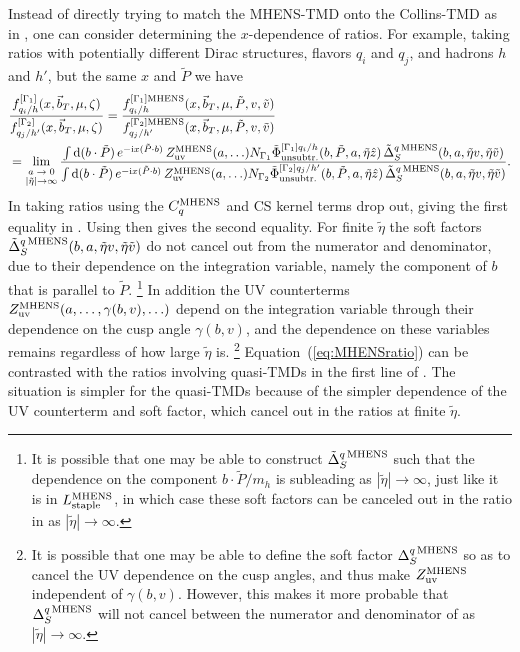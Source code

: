 \documentclass[11pt,a4paper]{article}
\newcommand{\df}{\mathrm{d}}
\newcommand{\img}{\mathrm{i}}
\newcommand{\nn}{\nonumber}
\newcommand{\bt}{\vec b_T}
\begin{document}
Instead of directly trying to match the MHENS-TMD onto the Collins-TMD as in , one can consider determining the $x$-dependence of ratios. For example, taking ratios with potentially different Dirac structures, flavors $q_i$ and $q_j$, and hadrons $h$ and $h'$, but the same $x$ and $\tilde P$ we have
\begin{align}\label{eq:MHENSratio}
 & \frac{ f_{q_i/h}^{[\Gamma_1]}(x,\bt, \mu, \zeta) }
   { f_{q_j/h'}^{[\Gamma_2]}(x,\bt, \mu, \zeta)}
 =  \frac{ f_{q_i/h}^{[\Gamma_1]{\rm MHENS}}(x,\bt, \mu, \tilde P,v,\tilde v) }
   { f_{q_j/h'}^{[\Gamma_2]{\rm MHENS}}(x,\bt, \mu, \tilde P,v,\tilde v)}
  \\
 &= \lim_{\stackrel{\text{\scriptsize $a\to0$}}{|\tilde\eta|\to\infty}}
  \frac{\int\df(b\cdot\tilde P)\, e^{-\img x(\tilde P\cdot b)}\, 
    Z_{\rm uv}^{\rm MHENS}(a,\ldots) 
    N_{\Gamma_1} \tilde \Phi_{\rm unsubtr.}^{[\Gamma_1]q_i/h}(b,\tilde P,a,\tilde\eta\hat z)\, 
 \tilde\Delta_S^{q\,{\rm MHENS}}(b, a, \tilde\eta v,\tilde\eta \tilde v)}
{\int\df(b\cdot\tilde P)\, e^{-\img x(\tilde P\cdot b)}\, 
    Z_{\rm uv}^{\rm MHENS}(a,\ldots) 
    N_{\Gamma_2} \tilde \Phi_{\rm unsubtr.}^{[\Gamma_2]q_j/h'}(b,\tilde P,a,\tilde\eta\hat z)\, 
 \tilde\Delta_S^{q\,{\rm MHENS}}(b, a, \tilde\eta v,\tilde\eta \tilde v)}
 . \nn
\end{align}
In taking ratios using  the $C_q^{\rm MHENS}$ and CS kernel terms drop out, giving the first equality in . Using  then gives the second equality.  For finite $\tilde\eta$ the soft factors $\tilde\Delta_S^{q\,{\rm MHENS}}(b,a,\tilde\eta v,\tilde\eta\tilde v)$ do not cancel out from the numerator and denominator, due to their dependence on the integration variable, namely the component of $b$ that is parallel to $\tilde P$.%
\footnote{It is possible that one may be able to construct $\tilde\Delta_S^{q\,{\rm MHENS}}$ such that the dependence on the component $b\cdot\tilde P/m_h$ is subleading as $|\tilde\eta|\to \infty$, just like it is in $L_{\rm staple}^{\rm MHENS}$,  in which case these soft factors can be canceled out in the ratio in  as $|\tilde\eta|\to \infty$.}
In addition the UV counterterms $Z_{\rm uv}^{\rm MHENS}(a,\ldots,\gamma(b,v),\ldots)$ depend on the integration variable through their dependence on the cusp angle $\gamma(b,v)$, and the dependence on these variables remains regardless of how large $\tilde \eta$ is.%
\footnote{It is possible that one may be able to define the soft factor $\Delta_S^{q\,{\rm MHENS}}$ so as to cancel the UV dependence on the cusp angles, and thus make $Z_{\rm uv}^{\rm MHENS}$ independent of $\gamma(b,v)$. However, this makes it more probable that $\Delta_S^{q\,{\rm MHENS}}$ will not cancel between the numerator and denominator of  as $|\tilde\eta|\to \infty$.}
Equation~(\ref{eq:MHENSratio}) can be contrasted with the ratios involving quasi-TMDs in the first line of . The situation is simpler for the quasi-TMDs because of the simpler dependence of the UV counterterm and soft factor, which cancel out in the ratios at finite $\tilde\eta$.  
\end{document}
